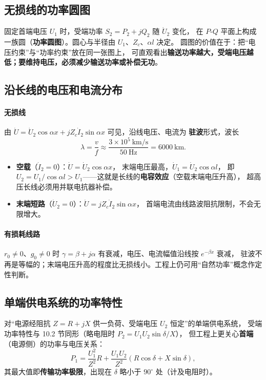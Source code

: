 \subsection{无损线的功率圆图}

固定首端电压 $U_1$ 时，受端功率 $S_2=P_2+jQ_2$ 随 $\dot U_2$ 变化，
在 $P$-$Q$ 平面上构成一族圆（\textbf{功率圆图}）。圆心与半径由 $U_1$、$Z_c$、$\alpha l$ 决定。
圆图的价值在于：把“电压约束”与“功率约束”放在同一张图上，
可直观看出\textbf{输送功率越大，受端电压越低；要维持电压，必须减少输送功率或补偿无功}。

\subsection{沿长线的电压和电流分布}

\paragraph{无损线}
由 $\dot U=\dot U_2\cos\alpha x+jZ_c\dot I_2\sin\alpha x$ 可见，沿线电压、电流为
\textbf{驻波}形式，波长
\begin{equation}
  \lambda=\frac{v}{f}\approx\frac{3\times10^{5}\ \text{km/s}}{50\ \text{Hz}}=6000\ \text{km}.
\end{equation}
\begin{itemize}
  \item \textbf{空载}（$\dot I_2=0$）：$\dot U=\dot U_2\cos\alpha x$，
        末端电压最高，$\dot U_1=\dot U_2\cos\alpha l$，
        即 $U_2=U_1/\cos\alpha l>U_1$——这就是长线的\textbf{电容效应}（空载末端电压升高），
        超高压长线必须用并联电抗器补偿。
  \item \textbf{末端短路}（$\dot U_2=0$）：$\dot U=jZ_c\dot I_2\sin\alpha x$，
        首端电流由线路波阻抗限制，不会无限增大。
\end{itemize}

\paragraph{有损耗线路}
$r_0\ne0$、$g_0\ne0$ 时 $\gamma=\beta+j\alpha$ 有衰减，电压、电流幅值沿线按 $e^{-\beta x}$ 衰减，
驻波不再是等幅的；末端电压升高的程度比无损线小。工程上仍可用“自然功率”概念作定性判断。

\subsection{单端供电系统的功率特性}

对“电源经阻抗 $Z=R+jX$ 供一负荷、受端电压 $U_2$ 恒定”的单端供电系统，
受端功率特性与 10.2 节同形（略电阻时 $P_2=U_1U_2\sin\delta/X$），
但工程上更关心\textbf{首端}（电源侧）的功率与电压关系：
\begin{equation}
  P_1=\frac{U_1^{2}}{Z^{2}}R+\frac{U_1U_2}{Z^{2}}\left(R\cos\delta+X\sin\delta\right),
\end{equation}
其最大值即\textbf{传输功率极限}，出现在 $\delta$ 略小于 $90^\circ$ 处（计及电阻时）。

